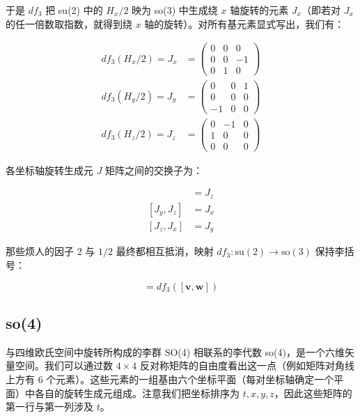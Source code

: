 于是 $df_3$ 把 su(2) 中的 $H_x/2$ 映为 so(3) 中生成绕 $x$ 轴旋转的元素 $J_x$（即若对 $J_x$ 的任一倍数取指数，就得到绕 $x$ 轴的旋转）。对所有基元素显式写出，我们有：

\begin{align}
df_3(H_x/2) = J_x &= \begin{pmatrix} 0 & 0 & 0 \\ 0 & 0 & -1 \\ 0 & 1 & 0 \end{pmatrix} \\
df_3(H_y/2) = J_y &= \begin{pmatrix} 0 & 0 & 1 \\ 0 & 0 & 0 \\ -1 & 0 & 0 \end{pmatrix} \\
df_3(H_z/2) = J_z &= \begin{pmatrix} 0 & -1 & 0 \\ 1 & 0 & 0 \\ 0 & 0 & 0 \end{pmatrix}
\end{align}

各坐标轴旋转生成元 $J$ 矩阵之间的交换子为：

\begin{align}
[J_x,J_y] &= J_z \\
[J_y,J_z] &= J_x \\
[J_z,J_x] &= J_y
\end{align}

那些烦人的因子 2 与 $1/2$ 最终都相互抵消，映射 $df_3:\mathrm{su}(2)\to\mathrm{so}(3)$ 保持李括号：

\begin{equation}
[df_3(\mathbf{v}), df_3(\mathbf{w})] = df_3([\mathbf{v},\mathbf{w}])
\end{equation}

\subsection{so(4)}

与四维欧氏空间中旋转所构成的李群 SO(4) 相联系的李代数 so(4)，是一个六维矢量空间。我们可以通过数 $4\times 4$ 反对称矩阵的自由度看出这一点（例如矩阵对角线上方有 6 个元素）。这些元素的一组基由六个坐标平面（每对坐标轴确定一个平面）中各自的旋转生成元组成。注意我们把坐标排序为 $t,x,y,z$，因此这些矩阵的第一行与第一列涉及 $t$。

